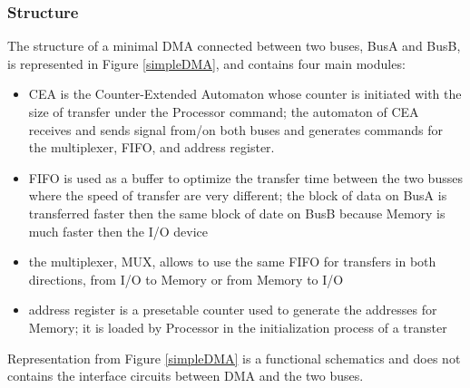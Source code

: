 \subsubsection{Structure}

The structure of a minimal DMA connected between two buses, BusA and BusB, is represented in Figure \ref{simpleDMA}, and contains four main modules:


\begin{itemize}
    \item CEA is the Counter-Extended Automaton whose counter is initiated with the size of transfer under the Processor command; the automaton of CEA receives and sends signal from/on both buses and generates commands for the multiplexer,  FIFO, and address register.
    \item FIFO is used as a buffer to optimize the transfer time between the two busses where the speed of transfer are very different; the block of data on BusA is transferred faster then the same block of date on BusB because Memory is much faster then the I/O device
    \item the multiplexer, MUX, allows to use the same FIFO for transfers in both directions, from I/O to Memory or from Memory to I/O
    \item address register is a presetable counter used to generate the addresses for Memory; it is loaded by Processor in the initialization process of a transter
\end{itemize}
Representation from Figure \ref{simpleDMA} is a functional schematics and does not contains the interface circuits between DMA and the two buses.

